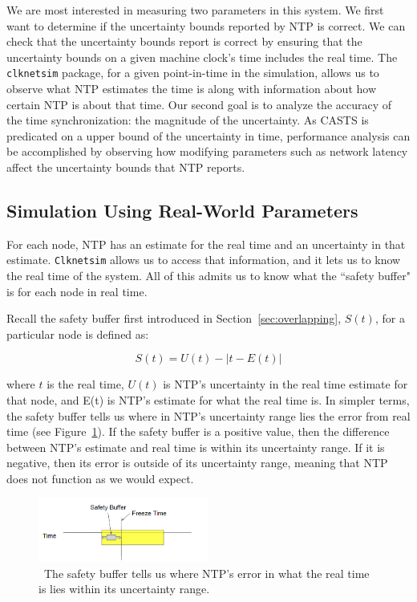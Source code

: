 We are most interested in measuring two parameters in this system. We
first want to determine if the uncertainty bounds reported by NTP is
correct. We can check that the uncertainty bounds report is correct
by ensuring that the uncertainty bounds on a given machine clock's
time includes the real time.  The \texttt{clknetsim} package, for a
given point-in-time in the simulation, allows us to observe what NTP
estimates the time is along with information about how certain NTP is
about that time. Our second goal is to analyze the accuracy of the
time synchronization: the magnitude of the uncertainty.  As 
CASTS is predicated on a upper bound of the uncertainty in time,
performance analysis can be accomplished by observing how modifying
parameters such as network latency affect the uncertainty bounds
that NTP reports.

\subsection{Simulation Using Real-World Parameters}

For each node, NTP has an estimate for the real time and an uncertainty
in that estimate. \texttt{Clknetsim} allows us to access that information, and
it lets us to know the real time of the system. All of this admits
us to know what the ``safety buffer" is for each node in real time.

Recall the safety buffer first introduced in Section~\ref{sec:overlapping}, $S(t)$,  for a particular node is defined as:

\[ S(t) = U(t) - | t - E(t)| \]

where $t$ is the real time, $U(t)$ is NTP's uncertainty in the real
time estimate for that node, and E(t) is NTP's estimate for what the
real time is. In simpler terms, the safety buffer tells us where in NTP's
uncertainty range lies the error from real time (see
Figure~\ref{fig:safety-diag}). If the safety buffer is a positive
value, then the difference between NTP's estimate and real time is
within its uncertainty range. If it is negative, then its error is
outside of its uncertainty range, meaning that NTP does not function as
we would expect.

\begin{figure}[!htbp]
  \centering
  \caption{~The safety buffer tells us where NTP's error in what the real time is lies within its uncertainty range.} 
  \label{fig:safety-diag}
  \includegraphics[width=0.5\textwidth]{safety-diagram.png}
\end{figure}

